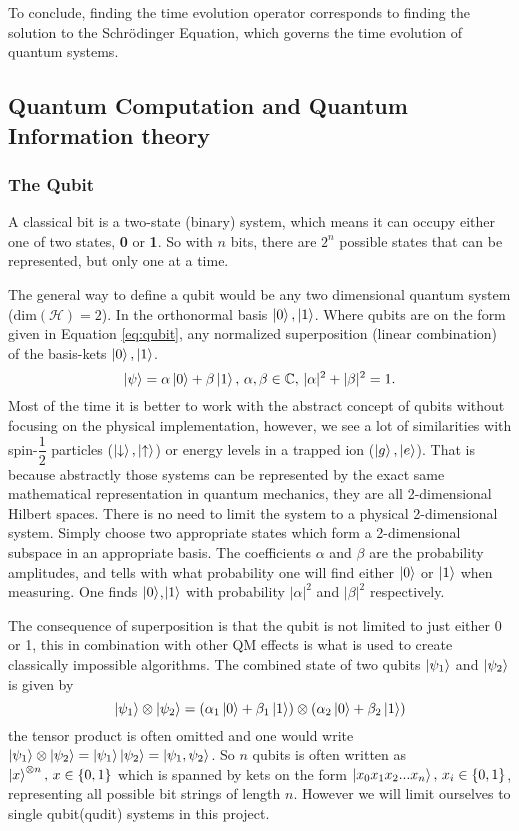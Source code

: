 To conclude, finding the time evolution operator corresponds to finding the solution to the Schrödinger Equation, which governs the time evolution of quantum systems.
\subsection{Quantum Computation and Quantum Information theory}

\subsubsection{The Qubit}
A classical bit is a two-state (binary) system, which means it can occupy either one of two states, \textbf{0} or \textbf{1}. So with $n$ bits, there are $2^n$ possible states that can be represented, but only one at a time.

The general way to define a qubit would be any two dimensional quantum system ($\text{dim}(\mathcal{H}) = 2$). In the orthonormal basis ${\ket{0},\ket{1}}$. Where qubits are on the form given in Equation \ref{eq:qubit}, any normalized superposition (linear combination) of the basis-kets $\ket{0},\ket{1}$.
\begin{equation}
\label{eq:qubit}
\ket{\psi} = \alpha\ket{0} + \beta\ket{1},\,\alpha,\beta \in \mathbb{C},\, |\alpha|^2 + |\beta|^2 = 1.
\end{equation}
Most of the time it is better to work with the abstract concept of qubits without focusing on the physical implementation, however, we see a lot of similarities with spin-$\dfrac{1}{2}$ particles ($\ket{\downarrow},\ket{\uparrow}$) or energy levels in a trapped ion ($\ket{g},\ket{e}$). That is because abstractly those systems can be represented by the exact same mathematical representation in quantum mechanics, they are all 2-dimensional Hilbert spaces. There is no need to limit the system to a physical 2-dimensional system. Simply choose two appropriate states which form a 2-dimensional subspace in an appropriate basis. The coefficients $\alpha$ and $\beta$ are the probability amplitudes, and tells with what probability one will find either $\ket{0}$ or $\ket{1}$ when measuring. One finds $\ket{0}$,$\ket{1}$ with probability $|\alpha|^2$ and $|\beta|^2$ respectively.

The consequence of superposition is that the qubit is not limited to just either 0 or 1, this in combination with other QM effects is what is used to create classically impossible algorithms\cite{shor,Grover}. The combined state of two qubits $\ket{\psi_1}$ and $\ket{\psi_2}$ is given by 
\begin{equation}
\ket{\psi_1} \otimes \ket{\psi_2} = (\alpha_1\ket{0} + \beta_1\ket{1})\otimes(\alpha_2\ket{0} + \beta_2\ket{1})
\end{equation}
the tensor product is often omitted and one would write $\ket{\psi_1} \otimes \ket{\psi_2} = \ket{\psi_1}\ket{\psi_2} = \ket{\psi_1, \psi_2}$.
So $n$ qubits is often written as $\ket{x}^{\otimes n},\, x \in \{0,1\}$ which is spanned by kets on the form $\ket{x_0x_1x_2...x_n},\, x_i \in \{0,1\}$, representing all possible bit strings of length $n$. However we will limit ourselves to single qubit(qudit) systems in this project.

